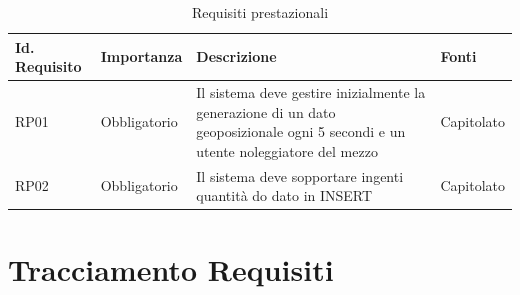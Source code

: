 \documentclass[11pt]{article}
\begin{document}
\begin{justify}
\begin{table}[H]
\centering
\renewcommand{\arraystretch}{1.5}
\begin{tabular}{|>{\centering\arraybackslash}m{2.7cm}|>{\centering\arraybackslash}m{2.7cm}|>{\centering\arraybackslash}m{6cm}|>{\centering\arraybackslash}m{2.1cm}|}
\hline
\textbf{Id. Requisito} & \textbf{Importanza} & \textbf{Descrizione} & \textbf{Fonti}\\
\hline
RP01 & Obbligatorio &  Il sistema deve gestire inizialmente la generazione di un dato geoposizionale ogni 5 secondi e un utente noleggiatore del mezzo & Capitolato\\
\hline
RP02 & Obbligatorio &  Il sistema deve sopportare ingenti quantità do dato in INSERT & Capitolato\\
\hline
\end{tabular}
\caption{Requisiti prestazionali}
\end{table}



\newpage
\section{Tracciamento Requisiti}


\end{justify}
\end{document}
